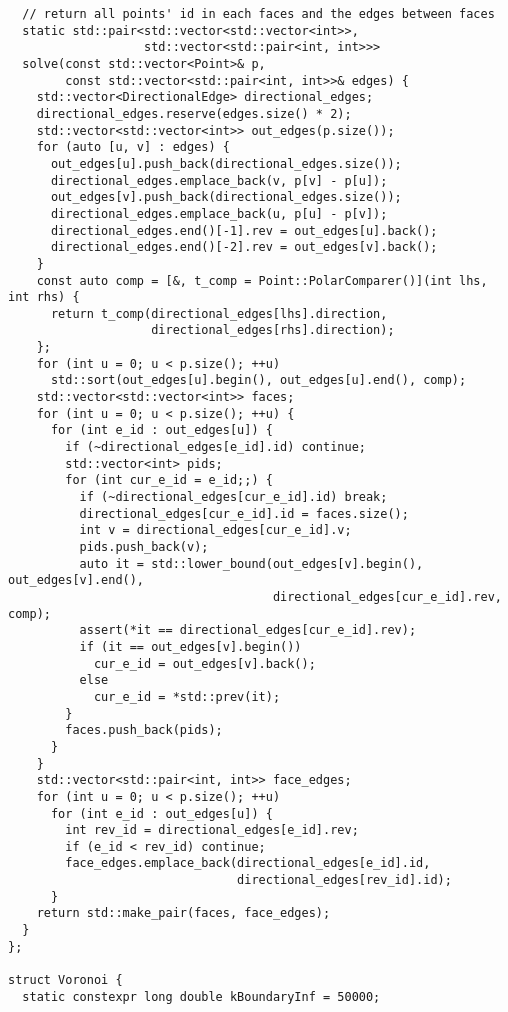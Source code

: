 \documentclass{article}
\begin{document}
\begin{multicols}{2}
\begin{lstlisting}
  // return all points' id in each faces and the edges between faces
  static std::pair<std::vector<std::vector<int>>,
                   std::vector<std::pair<int, int>>>
  solve(const std::vector<Point>& p,
        const std::vector<std::pair<int, int>>& edges) {
    std::vector<DirectionalEdge> directional_edges;
    directional_edges.reserve(edges.size() * 2);
    std::vector<std::vector<int>> out_edges(p.size());
    for (auto [u, v] : edges) {
      out_edges[u].push_back(directional_edges.size());
      directional_edges.emplace_back(v, p[v] - p[u]);
      out_edges[v].push_back(directional_edges.size());
      directional_edges.emplace_back(u, p[u] - p[v]);
      directional_edges.end()[-1].rev = out_edges[u].back();
      directional_edges.end()[-2].rev = out_edges[v].back();
    }
    const auto comp = [&, t_comp = Point::PolarComparer()](int lhs, int rhs) {
      return t_comp(directional_edges[lhs].direction,
                    directional_edges[rhs].direction);
    };
    for (int u = 0; u < p.size(); ++u)
      std::sort(out_edges[u].begin(), out_edges[u].end(), comp);
    std::vector<std::vector<int>> faces;
    for (int u = 0; u < p.size(); ++u) {
      for (int e_id : out_edges[u]) {
        if (~directional_edges[e_id].id) continue;
        std::vector<int> pids;
        for (int cur_e_id = e_id;;) {
          if (~directional_edges[cur_e_id].id) break;
          directional_edges[cur_e_id].id = faces.size();
          int v = directional_edges[cur_e_id].v;
          pids.push_back(v);
          auto it = std::lower_bound(out_edges[v].begin(), out_edges[v].end(),
                                     directional_edges[cur_e_id].rev, comp);
          assert(*it == directional_edges[cur_e_id].rev);
          if (it == out_edges[v].begin())
            cur_e_id = out_edges[v].back();
          else
            cur_e_id = *std::prev(it);
        }
        faces.push_back(pids);
      }
    }
    std::vector<std::pair<int, int>> face_edges;
    for (int u = 0; u < p.size(); ++u)
      for (int e_id : out_edges[u]) {
        int rev_id = directional_edges[e_id].rev;
        if (e_id < rev_id) continue;
        face_edges.emplace_back(directional_edges[e_id].id,
                                directional_edges[rev_id].id);
      }
    return std::make_pair(faces, face_edges);
  }
};

struct Voronoi {
  static constexpr long double kBoundaryInf = 50000;


\end{lstlisting}
\end{multicols}
\end{document}
